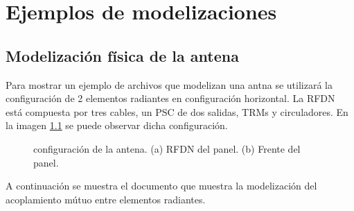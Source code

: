
\chapter{Ejemplos de modelizaciones} %

\label{AppendixC} %


\section{Modelización física de la antena}

Para mostrar un ejemplo de archivos que modelizan una antna se utilizará la configuración de 2 elementos radiantes en 
configuración horizontal. La RFDN está compuesta por tres cables, un PSC de dos salidas, TRMs y circuladores. En la imagen 
\ref{fig:RFDN_configuration} se puede observar dicha configuración.

\begin{figure}[H]
	\centering
	\caption{configuración de la antena. (a) RFDN del panel. (b) Frente del panel.}
	\label{fig:RFDN_configuration}
\end{figure}


A continuación se muestra el documento que muestra la modelización del acoplamiento mútuo entre elementos radiantes.


